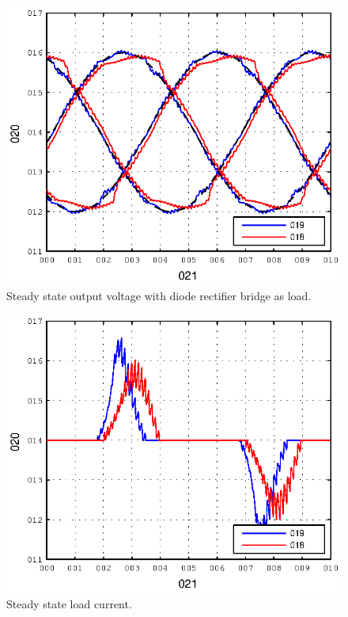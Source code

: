 \documentclass[conference,10pt]{IEEEtran}
\begin{document}
\begin{figure}[!h]
\centering

\includegraphics{fig/steady_state_vCf}
\caption{Steady state output voltage with diode rectifier bridge as load.}
\label{fig:ss_vc}
\end{figure}
\begin{figure}[!h]
\centering

\includegraphics{fig/steady_state_iLoad}
\caption{Steady state load current.}
\label{fig:sss_iload}
\end{figure}
\end{document}
